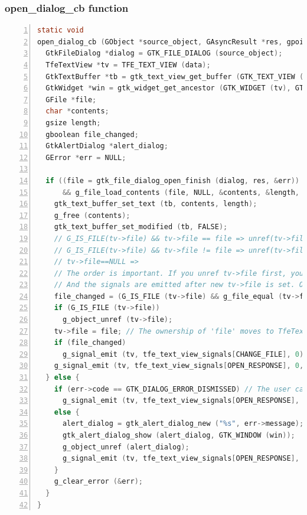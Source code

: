 \subsubsection{open\_dialog\_cb function}\label{open_dialog_cb-function}

\begin{lstlisting}[language=C, numbers=left]
static void
open_dialog_cb (GObject *source_object, GAsyncResult *res, gpointer data) {
  GtkFileDialog *dialog = GTK_FILE_DIALOG (source_object);
  TfeTextView *tv = TFE_TEXT_VIEW (data);
  GtkTextBuffer *tb = gtk_text_view_get_buffer (GTK_TEXT_VIEW (tv));
  GtkWidget *win = gtk_widget_get_ancestor (GTK_WIDGET (tv), GTK_TYPE_WINDOW);
  GFile *file;
  char *contents;
  gsize length;
  gboolean file_changed;
  GtkAlertDialog *alert_dialog;
  GError *err = NULL;

  if ((file = gtk_file_dialog_open_finish (dialog, res, &err)) != NULL
      && g_file_load_contents (file, NULL, &contents, &length, NULL, &err)) {
    gtk_text_buffer_set_text (tb, contents, length);
    g_free (contents);
    gtk_text_buffer_set_modified (tb, FALSE);
    // G_IS_FILE(tv->file) && tv->file == file => unref(tv->file), tv->file=file, emit response with SUCCESS
    // G_IS_FILE(tv->file) && tv->file != file => unref(tv->file), tv->file=file, emit response with SUCCESS, emit change-file
    // tv->file==NULL =>                                           tv->file=file, emit response with SUCCESS, emit change-file
    // The order is important. If you unref tv->file first, you can't compare tv->file and file anymore.
    // And the signals are emitted after new tv->file is set. Or the handler can't catch the new file.
    file_changed = (G_IS_FILE (tv->file) && g_file_equal (tv->file, file)) ? FALSE : TRUE;
    if (G_IS_FILE (tv->file))
      g_object_unref (tv->file);
    tv->file = file; // The ownership of 'file' moves to TfeTextView
    if (file_changed)
      g_signal_emit (tv, tfe_text_view_signals[CHANGE_FILE], 0);
    g_signal_emit (tv, tfe_text_view_signals[OPEN_RESPONSE], 0, TFE_OPEN_RESPONSE_SUCCESS);
  } else {
    if (err->code == GTK_DIALOG_ERROR_DISMISSED) // The user canceled the file chooser dialog
      g_signal_emit (tv, tfe_text_view_signals[OPEN_RESPONSE], 0, TFE_OPEN_RESPONSE_CANCEL);
    else {
      alert_dialog = gtk_alert_dialog_new ("%s", err->message);
      gtk_alert_dialog_show (alert_dialog, GTK_WINDOW (win));
      g_object_unref (alert_dialog);
      g_signal_emit (tv, tfe_text_view_signals[OPEN_RESPONSE], 0, TFE_OPEN_RESPONSE_ERROR);
    }
    g_clear_error (&err);
  }
}
\end{lstlisting}

